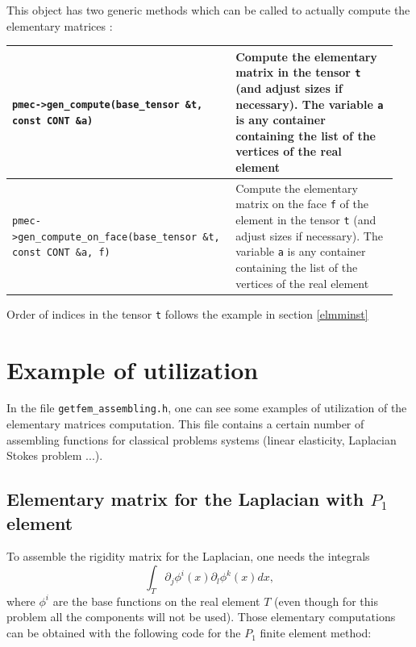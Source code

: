 \documentclass[11pt,a4paper]{article}
\begin{document}
This object has two generic methods which can be called to actually compute the elementary matrices :

\begin{center} \begin{tabular}{|m{0.55\linewidth}|m{0.4\linewidth}|} \hline
{\tt pmec->gen\_compute(base\_tensor \&t, const CONT \&a)} & Compute the elementary matrix in the tensor {\tt t} (and adjust sizes if necessary). The variable {\tt a} is any container containing the list of the vertices of the real element\\ \hline
{\tt pmec->gen\_compute\_on\_face(base\_tensor \&t, const CONT \&a, f)} & Compute the elementary matrix on the face {\tt f} of the element in the tensor {\tt t} (and adjust sizes if necessary). The variable {\tt a} is any container containing the list of the vertices of the real element\\ \hline
\end{tabular} \end{center}

Order of indices in the tensor {\tt t} follows the example in section \ref{elmminst}

\section{Example of utilization}
In the file {\tt getfem\_assembling.h}, one can see some examples of utilization of the elementary matrices computation. This file contains a certain number of assembling functions for classical problems systems (linear elasticity, Laplacian Stokes problem ...).

\subsection{Elementary matrix for the Laplacian with $P_1$ element}

To assemble the rigidity matrix for the Laplacian, one needs the integrals
$$ \int_T \partial_j \phi^i(x) \partial_l \phi^k(x) dx, $$
where $\phi^i$ are the base functions on the real element $T$ (even though for this problem all the components will not be used). Those elementary computations can be obtained with the following code for the $P_1$ finite element method:
\end{document}
